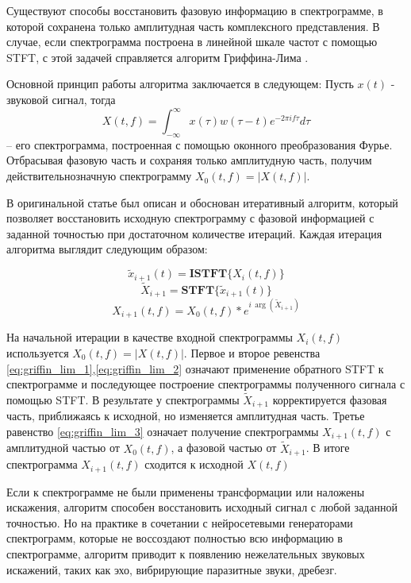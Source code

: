 Существуют способы восстановить фазовую информацию в спектрограмме, в которой сохранена только амплитудная часть комплексного представления.
В случае, если спектрограмма построена в линейной шкале частот с помощью STFT, с этой задачей справляется алгоритм Гриффина-Лима \cite{1164317}.

Основной принцип работы алгоритма заключается в следующем: Пусть $x(t)$ - звуковой сигнал, тогда 
\begin{equation}
X(t, f) = \int_{-\infty}^\infty x(\tau) w(\tau - t) e^{-2\pi i f \tau} d\tau
\end{equation}
 -- его спектрограмма, построенная с помощью оконного преобразования Фурье.
Отбрасывая фазовую часть и сохраняя только амплитудную часть, получим действительнозначную спектрограмму $X_0(t, f) = |X(t, f)|$.

В оригинальной статье \cite{1164317} был описан и обоснован итеративный алгоритм, который позволяет восстановить исходную спектрограмму 
с фазовой информацией с заданной точностью при достаточном количестве итераций. Каждая итерация алгоритма выглядит следующим образом:

\begin{equation}
  \tilde{x}_{i+1}(t) = \textbf{ISTFT}\{X_i(t, f)\}
  \label{eq:griffin_lim_1}
\end{equation}
\begin{equation}
  \tilde{X}_{i+1} = \textbf{STFT}\{\tilde{x}_{i+1}(t)\}
  \label{eq:griffin_lim_2}
\end{equation}
\begin{equation}
  X_{i+1}(t, f) = X_0(t, f) * e^{i\,\arg(\tilde{X}_{i+1})}
  \label{eq:griffin_lim_3}
\end{equation}

На начальной итерации в качестве входной спектрограммы $X_i(t, f)$ используется $X_0(t, f) = |X(t, f)|$. 
Первое и второе ревенства \ref{eq:griffin_lim_1},\ref{eq:griffin_lim_2} означают применение обратного STFT к спектрограмме 
и последующее построение спектрограммы полученного сигнала с помощью STFT. 
В результате у спектрограммы $\tilde{X}_{i+1}$ корректируется фазовая часть, приближаясь к исходной, но изменяется амплитудная часть.
Третье равенство \ref{eq:griffin_lim_3} означает получение спектрограммы $X_{i+1}(t, f)$ с амплитудной частью от $X_0(t, f)$, а фазовой частью от $\tilde{X}_{i+1}$.
В итоге спектрограмма $X_{i+1}(t, f)$ сходится к исходной $X(t, f)$

Если к спектрограмме не были применены трансформации или наложены искажения, алгоритм способен восстановить исходный сигнал с любой заданной точностью.
Но на практике в сочетании с нейросетевыми генераторами спектрограмм, которые не воссоздают полностью всю информацию в спектрограмме, 
алгоритм приводит к появлению нежелательных звуковых искажений, 
таких как эхо, вибрирующие паразитные звуки, дребезг. 


